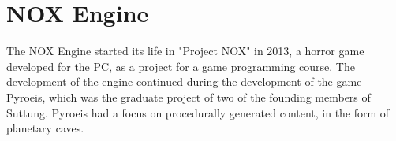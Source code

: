 \section{NOX Engine}
The NOX Engine started its life in "Project NOX" in 2013,
a horror game developed for the PC, as a project for a game programming course.
The development of the engine continued during the development of the game Pyroeis,
which was the graduate project of two of the founding members of Suttung.
Pyroeis had a focus on procedurally generated content, in the form of planetary caves.

